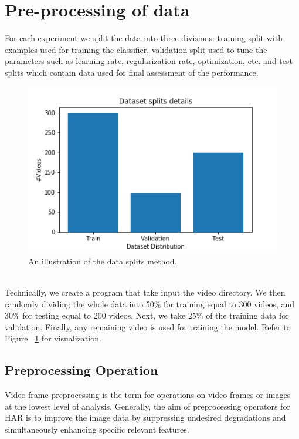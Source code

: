 \section{Pre-processing of data}
For each experiment we split the data into three divisions: training split with examples used for training the classifier, validation split used to tune the parameters such as learning rate, regularization rate, optimization, etc. and test splits which contain data used for final assessment of the performance.\\

\begin{figure}[th]
\centering
\includegraphics[width=0.83\columnwidth]{Chapters/photos/ds.png}
\decoRule
\caption[An illustration of the data splits method.]{An illustration of the data splits method.}
\label{fig:trainvalidtest}
\end{figure}\\

Technically, we create a program that take input the video directory. We then randomly dividing the whole data into 50\% for training equal to 300 videos, and 30\% for testing equal to 200 videos. Next, we take 25\% of the training data for validation. Finally, any remaining video is used for training the model. Refer to Figure ~\ref{fig:trainvalidtest} for visualization.

\subsection{Preprocessing Operation}
Video frame preprocessing is the term for operations on video frames or images at the lowest level of analysis. Generally, the aim of preprocessing operators
for HAR is to improve the image data by suppressing undesired degradations and simultaneously enhancing specific relevant features.\\

